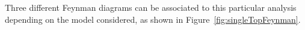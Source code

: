 \documentclass[a4paper, 10pt, openright]{report}
\begin{document}
Three different Feynman diagrams can be associated to this particular analysis depending on the model considered, as shown in Figure~\ref{fig:singleTopFeynman}.

\end{document}
